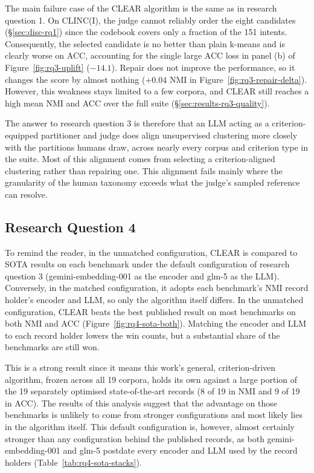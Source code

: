 \documentclass[11pt,a4paper,oneside]{report}
\begin{document}
The main failure case of the CLEAR algorithm is the same as in
research question 1. On CLINC(I), the judge cannot reliably order the
eight candidates (\S\ref{sec:disc-rq1}) since the codebook
covers only a fraction of the 151 intents. Consequently, the selected
candidate is no better than plain k-means and is clearly worse on ACC,
accounting for the single large ACC loss in panel (b) of
Figure~\ref{fig:rq3-uplift} ($-14.1$). Repair does not improve the
performance, so it changes the score by
almost nothing ($+0.04$ NMI in Figure~\ref{fig:rq3-repair-delta}). However, this weakness stays limited to a few corpora, and CLEAR
still reaches a high mean NMI and ACC over the
full suite (\S\ref{sec:results-rq3-quality}).


The answer to research question 3 is therefore that an LLM acting as a criterion-equipped partitioner and judge does align unsupervised clustering more closely with the partitions humans draw, across nearly every corpus and criterion type in the suite. Most of this alignment comes from selecting a criterion-aligned clustering rather than repairing one. This alignment fails mainly where the granularity of the human taxonomy exceeds what the judge's sampled reference can resolve.


\subsection{Research Question 4}

To remind the reader, in the unmatched configuration, CLEAR is compared to SOTA results on each benchmark under the default configuration of research question 3 ({\small\ttfamily gemini-embedding-001} as the encoder and {\small\ttfamily glm-5} as the LLM). Conversely, in the matched configuration, it adopts each benchmark's NMI record holder's encoder and LLM, so only the algorithm itself differs. In the unmatched configuration, CLEAR beats the best published result on most benchmarks on both NMI and ACC (Figure~\ref{fig:rq4-sota-both}). Matching the encoder and LLM to each record holder lowers the win counts, but a substantial share of the benchmarks are still won.

This is a strong result since it means this work's general, criterion-driven algorithm, frozen across all 19 corpora, holds its own against a large portion of the 19 separately optimised state-of-the-art records (8 of 19 in NMI and 9 of 19 in ACC). The results of this analysis suggest that the advantage on those benchmarks is unlikely to come from stronger configurations and most likely lies in the algorithm itself. This default configuration is, however, almost certainly
stronger than any configuration behind the published records, as both
{\small\ttfamily gemini-embedding-001} and {\small\ttfamily glm-5}
postdate every encoder and LLM used by the record holders
(Table~\ref{tab:rq4-sota-stacks}).
\end{document}
